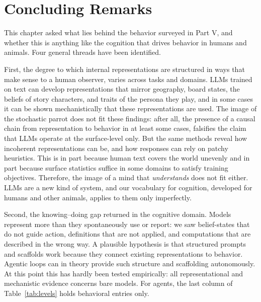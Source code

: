 
\section{Concluding Remarks}
This chapter asked what lies behind the behavior surveyed in Part V, and whether this is anything like the cognition that drives behavior in humans and animals. Four general threads have been identified.

First, the degree to which internal representations are structured in ways that make sense to a human observer, varies across tasks and domains. LLMs trained on text can develop representations that mirror geography, board states, the beliefs of story characters, and traits of the persona they play, and in some cases it can be shown mechanistically that these representations are used. The image of the stochastic parrot does not fit these findings: after all, the presence of a causal chain from representation to behavior in at least some cases, falsifies the claim that LLMs operate at the surface-level only. But the same methods reveal how incoherent representations can be, and how responses can rely on patchy heuristics. This is in part because human text covers the world unevenly and in part because surface statistics suffice in some domains to satisfy training objectives. Therefore, the image of a mind that \emph{understands} does not fit either. LLMs are a new kind of system, and our vocabulary for cognition, developed for humans and other animals, applies to them only imperfectly.

Second, the knowing--doing gap returned in the cognitive domain. Models represent more than they spontaneously use or report: we saw belief-states that do not guide action, definitions that are not applied, and computations that are described in the wrong way. A plausible hypothesis is that structured prompts and scaffolds work because they connect existing representations to behavior. Agentic loops can in theory provide such structure and scaffolding autonomously. At this point this has hardly been tested empirically: all representational and mechanistic evidence concerns bare models. For agents, the last column of Table~\ref{tab:levels} holds behavioral entries only.

